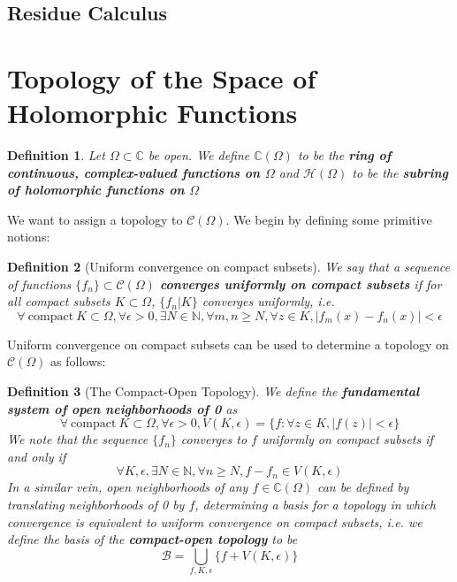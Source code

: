 \documentclass{article}
\newcommand{\mbb}[1]{\mathbb{#1}}
\newcommand{\mc}[1]{\mathcal{#1}}
\newtheorem{definition}{Definition}
\begin{document}
\subsection{Residue Calculus}

\section{Topology of the Space of Holomorphic Functions}

\begin{definition}
Let \(\Omega \subset \mbb{C}\) be open. We define \(\mbb{C}(\Omega)\) to be the \textbf{ring of continuous, complex-valued functions on \(\Omega\)} and \(\mc{H}(\Omega)\) to be the \textbf{subring of holomorphic functions on \(\Omega\)}
\end{definition}
We want to assign a topology to \(\mc{C}(\Omega)\). We begin by defining some primitive notions:
\begin{definition}[Uniform convergence on compact subsets]
We say that a sequence of functions \(\{f_n\} \subset \mc{C}(\Omega)\) \textbf{converges uniformly on compact subsets} if for all compact subsets \(K \subset \Omega\), \(\{f_n | K\}\) converges uniformly, i.e.
\begin{equation}\forall \ \text{compact} \ K \subset \Omega, \forall \epsilon > 0, \exists N \in \mbb{N}, \forall m, n \geq N, \forall z \in K, |f_m(x) - f_n(x)| < \epsilon\end{equation}
\end{definition}
Uniform convergence on compact subsets can be used to determine a topology on \(\mc{C}(\Omega)\) as follows:
\begin{definition}[The Compact-Open Topology]
We define the \textbf{fundamental system of open neighborhoods of 0} as
\begin{equation}\forall \ \text{compact} \ K \subset \Omega, \forall \epsilon > 0, V(K, \epsilon) = \{f: \forall z \in K, |f(z)| < \epsilon\}\end{equation}
We note that the sequence \(\{f_n\}\) converges to \(f\) uniformly on compact subsets if and only if
\begin{equation}\forall K, \epsilon, \exists N \in \mbb{N}, \forall n \geq N, f - f_n \in V(K, \epsilon)\end{equation}
In a similar vein, open neighborhoods of any \(f \in \mbb{C}(\Omega)\) can be defined by translating neighborhoods of 0 by \(f\), determining a basis for a topology in which convergence is equivalent to uniform convergence on compact subsets, i.e. we define the basis of the \textbf{compact-open topology} to be
\begin{equation}\mc{B} = \bigcup_{f, K, \epsilon}\{f + V(K, \epsilon)\}\end{equation}
\end{definition}
\end{document}
